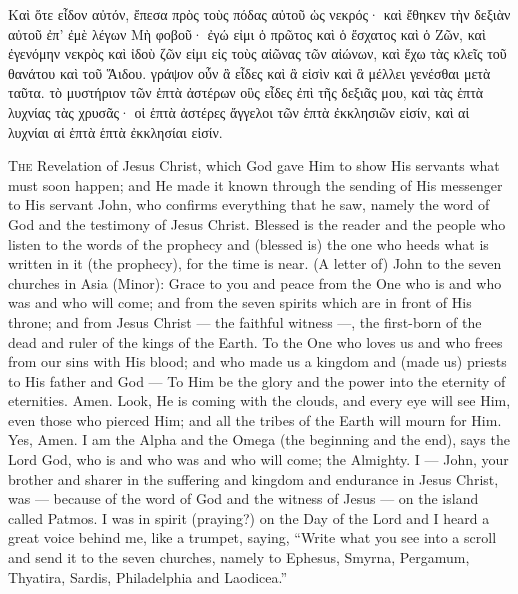 \begin{pages}
\begin{Rightside}
		\pend
		\pstart
			Καὶ ὅτε εἶδον αὐτόν, ἔπεσα πρὸς τοὺς πόδας αὐτοῦ ὡς νεκρός· καὶ ἔθηκεν τὴν δεξιὰν αὐτοῦ ἐπ’ ἐμὲ λέγων Μὴ φοβοῦ· ἐγώ εἰμι ὁ πρῶτος καὶ ὁ ἔσχατος καὶ ὁ Ζῶν, καὶ ἐγενόμην νεκρὸς καὶ ἰδοὺ ζῶν εἰμι εἰς τοὺς αἰῶνας τῶν αἰώνων, καὶ ἔχω τὰς κλεῖς τοῦ θανάτου καὶ τοῦ Ἅιδου. γράψον οὖν ἃ εἶδες καὶ ἃ εἰσὶν καὶ ἃ μέλλει γενέσθαι μετὰ ταῦτα. τὸ μυστήριον τῶν ἑπτὰ ἀστέρων οὓς εἶδες ἐπὶ τῆς δεξιᾶς μου, καὶ τὰς ἑπτὰ λυχνίας τὰς χρυσᾶς· οἱ ἑπτὰ ἀστέρες ἄγγελοι τῶν ἑπτὰ ἐκκλησιῶν εἰσίν, καὶ αἱ λυχνίαι αἱ ἑπτὰ ἑπτὰ ἐκκλησίαι εἰσίν.
		\pend
        \endnumbering
    \end{Rightside}
    \begin{Leftside}
        \beginnumbering
        		\renewcommand\LettrineFontHook{\Zallmanfamily}
			\lettrine[lines=3]{T}{he} Revelation of Jesus Christ, which God gave Him to show His servants what must soon happen; and He made it known through the sending of His messenger to His servant John, who confirms everything that he saw, namely the word of God and the testimony of Jesus Christ. Blessed is the reader and the people who listen to the words of the prophecy and (blessed is) the one who heeds what is written in it (the prophecy), for the time is near.
		\pend
		\pstart
			(A letter of) John to the seven churches in Asia (Minor): Grace to you and peace from the One who is and who was and who will come; and from the seven spirits which are in front of His throne; and from Jesus Christ — the faithful witness —, the first-born of the dead and ruler of the kings of the Earth.
		\pend
		\pstart
			To the One who loves us and who frees from our sins with His blood; and who made us a kingdom and (made us) priests to His father and God — To Him be the glory and the power into the eternity of eternities. Amen.
		\pend
		\pstart
			Look, He is coming with the clouds, and every eye will see Him, even those who pierced Him; and all the tribes of the Earth will mourn for Him. Yes, Amen.
		\pend
		\pstart
			I am the Alpha and the Omega (the beginning and the end), says the Lord God, who is and who was and who will come; the Almighty.
		\pend
		\pstart
			I — John, your brother and sharer in the suffering and kingdom and endurance in Jesus Christ, was — because of the word of God and the witness of Jesus — on the island called Patmos. I was in spirit (praying?) on the Day of the Lord and I heard a great voice behind me, like a trumpet, saying, “Write what you see into a scroll and send it to the seven churches, namely to Ephesus, Smyrna, Pergamum, Thyatira, Sardis, Philadelphia and Laodicea.”

\end{Leftside}
\end{pages}
